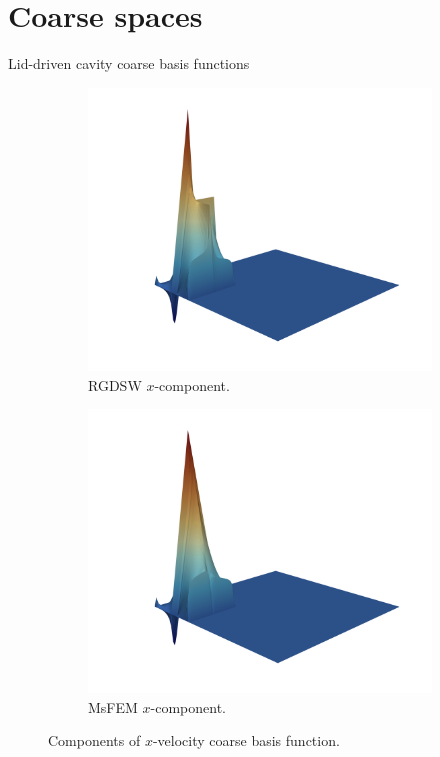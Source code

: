 \section{Coarse spaces}
\begin{frame}{Lid-driven cavity coarse basis functions}
	\begin{figure}
		\centering
		\begin{subfigure}{0.5\textwidth}
			\includegraphics[width=\textwidth]{images/RGDSW-x}
			\caption{RGDSW $x$-component.}
		\end{subfigure}%
		\begin{subfigure}{0.5\textwidth}
			\includegraphics[width=\textwidth]{images/MsFEM-x}
			\caption{MsFEM $x$-component.}
		\end{subfigure}
		\caption{Components of $x$-velocity coarse basis function.}
	\end{figure}
\end{frame}

